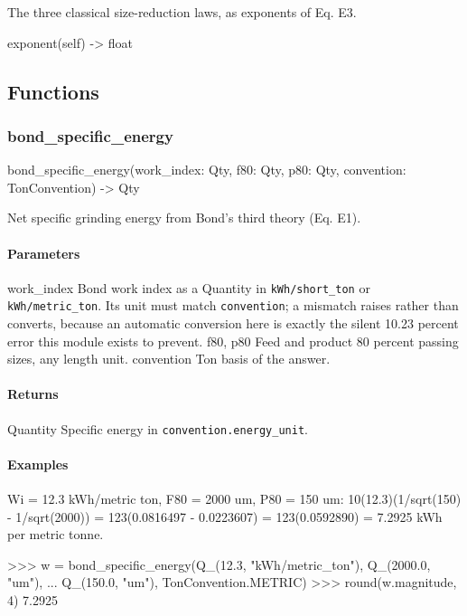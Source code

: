 \documentclass[10pt,a4paper,twoside]{report}
\begin{document}
The three classical size-reduction laws, as exponents of Eq. E3.

\begin{verbatimsmall}
exponent(self) -> float
\end{verbatimsmall}

\subsection*{Functions}

\subsubsection*{bond\_specific\_energy}

\begin{verbatimsmall}
bond_specific_energy(work_index: Qty, f80: Qty, p80: Qty, convention: TonConvention) -> Qty
\end{verbatimsmall}

Net specific grinding energy from Bond's third theory (Eq. E1).

\paragraph*{Parameters}

work\_index Bond work index as a Quantity in \texttt{kWh/short\_ton} or \texttt{kWh/metric\_ton}. Its unit must match \texttt{convention}; a mismatch raises rather than converts, because an automatic conversion here is exactly the silent 10.23 percent error this module exists to prevent. f80, p80 Feed and product 80 percent passing sizes, any length unit. convention Ton basis of the answer.

\paragraph*{Returns}

Quantity Specific energy in \texttt{convention.energy\_unit}.

\paragraph*{Examples}

Wi = 12.3 kWh/metric ton, F80 = 2000 um, P80 = 150 um: 10(12.3)(1/sqrt(150) - 1/sqrt(2000)) = 123(0.0816497 - 0.0223607) = 123(0.0592890) = 7.2925 kWh per metric tonne.

\begin{doctestblock}
>>> w = bond_specific_energy(Q_(12.3, "kWh/metric_ton"), Q_(2000.0, "um"),
...                          Q_(150.0, "um"), TonConvention.METRIC)
>>> round(w.magnitude, 4)
7.2925
\end{doctestblock}
\end{document}
